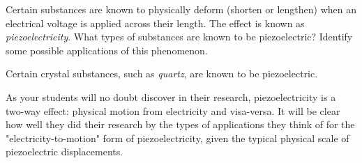 

Certain substances are known to physically deform (shorten or lengthen) when an electrical voltage is applied across their length.  The effect is known as {\it piezoelectricity}.  What types of substances are known to be piezoelectric?  Identify some possible applications of this phenomenon.







Certain crystal substances, such as {\it quartz}, are known to be piezoelectric.







As your students will no doubt discover in their research, piezoelectricity is a two-way effect: physical motion from electricity and visa-versa.  It will be clear how well they did their research by the types of applications they think of for the "electricity-to-motion" form of piezoelectricity, given the typical physical scale of piezoelectric displacements.




